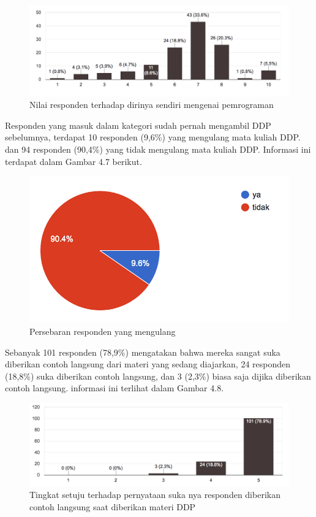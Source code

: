 	\begin{figure}
		\includegraphics[width=\linewidth]{pics/nilai-pemograman}
		\caption{Nilai responden terhadap dirinya sendiri mengenai pemrograman}
		\centering
	\end{figure}
	Responden yang masuk dalam kategori sudah pernah mengambil DDP sebelumnya, terdapat 10 responden (9,6\%) yang mengulang mata kuliah DDP. dan 94 responden (90,4\%) yang tidak mengulang mata kuliah DDP. Informasi ini terdapat dalam Gambar 4.7 berikut.
	\begin{figure}
		\includegraphics[width=\linewidth]{pics/mengulang-ddp}
		\caption{Persebaran responden yang mengulang}
		\centering
	\end{figure}
	Sebanyak 101 responden (78,9\%) mengatakan bahwa mereka sangat suka diberikan contoh langsung dari materi yang sedang diajarkan, 24 responden (18,8\%) suka diberikan contoh langsung, dan 3 (2,3\%) biasa saja dijika diberikan contoh langsung. informasi ini terlihat dalam Gambar 4.8.
	\begin{figure}
		\includegraphics[width=\linewidth]{pics/contoh-langsung}
		\caption{Tingkat setuju terhadap pernyataan suka nya responden diberikan contoh langsung saat diberikan materi DDP}
		\centering
	\end{figure}
